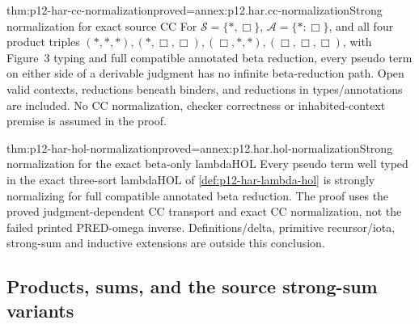 \begin{hbtheorem}{thm:p12-har-cc-normalization}{proved=annex:p12.har.cc-normalization}{Strong normalization for exact source CC}
For \(\mathcal S=\{\ast,\Box\}\),
\(\mathcal A=\{\ast:\Box\}\), and all four product triples
\((\ast,\ast,\ast),(\ast,\Box,\Box),
(\Box,\ast,\ast),(\Box,\Box,\Box)\), with Figure~3 typing
and full compatible annotated beta reduction, every pseudo term on
either side of a derivable judgment has no infinite beta-reduction path.
Open valid contexts, reductions beneath binders, and reductions in
types/annotations are included. No CC normalization, checker correctness
or inhabited-context premise is assumed in the proof.
\end{hbtheorem}

\begin{hbtheorem}{thm:p12-har-hol-normalization}{proved=annex:p12.har.hol-normalization}{Strong normalization for the exact beta-only lambdaHOL}
Every pseudo term well typed in the exact three-sort lambdaHOL of
\cref{def:p12-har-lambda-hol} is strongly normalizing for full compatible
annotated beta reduction. The proof uses the proved judgment-dependent
CC transport and exact CC normalization, not the failed printed PRED-omega
inverse. Definitions/delta, primitive recursor/iota, strong-sum and
inductive extensions are outside this conclusion.
\end{hbtheorem}



\subsection{Products, sums, and the source strong-sum variants}

